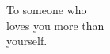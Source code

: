 \label{chap:dedication}

\begin{center}
  \null
  \vspace{2.7in}
  \bigskip
  

  To someone who\\
  loves you more than\\
  yourself.\\


  \newpage
\end{center}